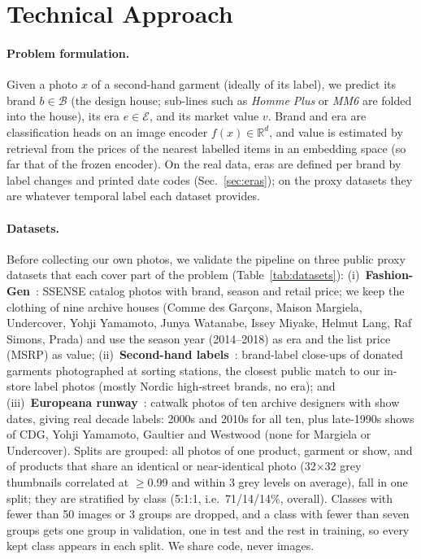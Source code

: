 \section{Technical Approach}
\label{sec:approach}



\paragraph{Problem formulation.}
Given a photo $x$ of a second-hand garment (ideally of its label), we predict its brand
$b \in \mathcal{B}$ (the design house; sub-lines such as \emph{Homme Plus} or \emph{MM6} are folded
into the house), its era $e \in \mathcal{E}$, and its market value $v$. Brand and era are classification
heads on an image encoder $f(x)\in\mathbb{R}^d$, and value is estimated by retrieval from the prices
of the nearest labelled items in an embedding space (so far that of the frozen encoder).
On the real data, eras are defined per brand by label changes and printed date codes
(Sec.~\ref{sec:eras}); on the
proxy datasets they are whatever temporal label each dataset provides.

\paragraph{Datasets.}
Before collecting our own photos, we validate the pipeline on three public proxy datasets that
each cover part of the problem (Table~\ref{tab:datasets}):
(i)~\textbf{Fashion-Gen}~\cite{rostamzadeh2018fashiongen}: SSENSE catalog photos with brand,
season and retail price; we keep the clothing of nine archive houses (Comme des Gar\c{c}ons,
Maison Margiela, Undercover, Yohji Yamamoto, Junya Watanabe, Issey Miyake, Helmut Lang,
Raf Simons, Prada) and use the season year (2014--2018) as era and the list price (MSRP) as
value;
(ii)~\textbf{Second-hand labels}~\cite{secondhand2024dataset}: brand-label close-ups of donated
garments photographed at sorting stations, the closest public match to our in-store label photos
(mostly Nordic high-street brands, no era); and
(iii)~\textbf{Europeana runway}~\cite{europeana_api}: catwalk photos of ten archive designers with
show dates, giving real decade labels: 2000s and 2010s for all ten, plus late-1990s shows of CDG,
Yohji Yamamoto, Gaultier and Westwood (none for Margiela or Undercover).
Splits are grouped: all photos of one product, garment or show, and of products that share an
identical or near-identical photo (32$\times$32 grey thumbnails correlated at $\geq$0.99 and within
3 grey levels on average), fall in one split; they are stratified by class (5:1:1, i.e.\
71/14/14\%, overall). Classes with fewer than 50 images or 3 groups are dropped, and a class with
fewer than seven groups gets one group in validation, one in test and the rest in training, so every
kept class appears in each split. We share code, never images.

